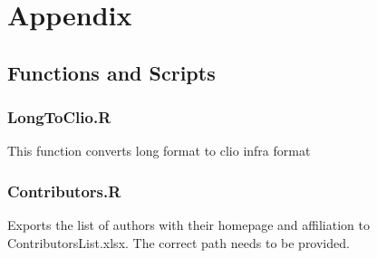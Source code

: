 \documentclass[a4paper]{article}
\begin{document}
%
%

\section{Appendix}
\subsection{Functions and Scripts}
\subsubsection{LongToClio.R}
This function converts long format to clio infra format
\subsubsection{Contributors.R}
Exports the list of authors with their homepage and affiliation to 
ContributorsList.xlsx. The correct path needs to be provided.
\end{document}
